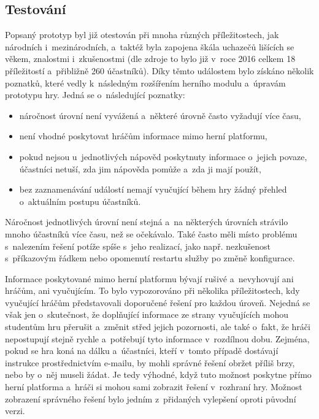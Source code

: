 \documentclass[
  digital, %
  oneside, %
  table,   %
  nolof,     %
  nolot,     %
]{fithesis3}
\begin{document}
\subsection{Testování} \label{gameTesting}
Popsaný prototyp byl již otestován při mnoha různých příležitostech, jak národních i~mezinárodních, a~taktéž byla zapojena škála uchazečů lišících se věkem, znalostmi i~zkušenostmi (dle zdroje \cite{ctfDesign} to bylo již v~roce 2016 celkem 18 příležitostí a~přibližně 260 účastníků).
Díky těmto událostem bylo získáno několik poznatků, které vedly k~následným rozšířením herního modulu a~úpravám prototypu hry. Jedná se o~následující poznatky:
\begin{itemize}
  \item náročnost úrovní není vyvážená a~některé úrovně často vyžadují více času,
  \item není vhodné poskytovat hráčům informace mimo herní platformu,
  \item pokud nejsou u~jednotlivých nápověd poskytnuty informace o~jejich povaze, účastníci netuší, zda jim nápověda pomůže a~zda ji mají použít,
  \item bez zaznamenávání událostí nemají vyučující během hry žádný přehled o~aktuálním postupu účastníků.
\end{itemize}
Náročnost jednotlivých úrovní není stejná a~na některých úrovních strávilo mnoho účastníků více času, než se očekávalo. Také často měli místo problému s~nalezením řešení potíže spíše s~jeho realizací, jako např. nezkušenost s~příkazovým řádkem nebo opomenutí restartu služby po změně konfigurace.\par
Informace poskytované mimo herní platformu bývají rušivé a~nevyhovují ani hráčům, ani vyučujícím. To bylo vypozorováno při několika příležitostech, kdy vyučující hráčům představovali doporučené řešení pro každou úroveň. Nejedná se však jen o~skutečnost, že doplňující informace ze strany vyučujících mohou studentům hru přerušit a~změnit střed jejich pozornosti, ale také o~fakt, že hráči nepostupují stejně rychle a~potřebují tyto informace v~rozdílnou dobu. Zejména, pokud se hra koná na dálku a~účastníci, kteří v~tomto případě dostávají instrukce prostřednictvím e-mailu, by mohli správné řešení obržet příliš brzy, nebo by o~něj museli žádat. Je tedy výhodné, když tuto možnost poskytne přímo herní platforma a~hráči si mohou sami zobrazit řešení v~rozhraní hry. Možnost zobrazení správného řešení bylo jedním z~přidaných vylepšení oproti původní verzi.\par
\end{document}
